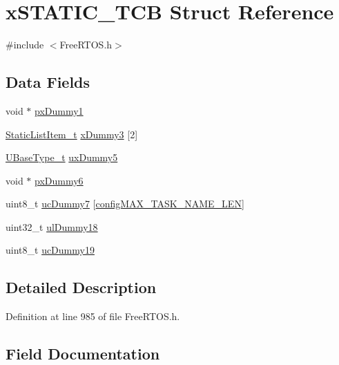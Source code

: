 \hypertarget{structx_s_t_a_t_i_c___t_c_b}{}\section{x\+S\+T\+A\+T\+I\+C\+\_\+\+T\+CB Struct Reference}
\label{structx_s_t_a_t_i_c___t_c_b}


{\ttfamily \#include $<$Free\+R\+T\+O\+S.\+h$>$}

\subsection*{Data Fields}
\begin{DoxyCompactItemize}
\item 
void $\ast$ \hyperlink{structx_s_t_a_t_i_c___t_c_b_a2f66b620fdeb13f8969f27e1bbb4d1d1}{px\+Dummy1}
\item 
\hyperlink{_free_r_t_o_s_8h_a1d31bc0472385a87424518da484d9e09}{Static\+List\+Item\+\_\+t} \hyperlink{structx_s_t_a_t_i_c___t_c_b_a7f182aa8f5003494f63d975dabcb3ec1}{x\+Dummy3} \mbox{[}2\mbox{]}
\item 
\hyperlink{portmacro_8h_a646f89d4298e4f5afd522202b11cb2e6}{U\+Base\+Type\+\_\+t} \hyperlink{structx_s_t_a_t_i_c___t_c_b_ab950bb498901ef7291e49086e5a2efd0}{ux\+Dummy5}
\item 
void $\ast$ \hyperlink{structx_s_t_a_t_i_c___t_c_b_a416495e152e5caef64994f72329c60b0}{px\+Dummy6}
\item 
uint8\+\_\+t \hyperlink{structx_s_t_a_t_i_c___t_c_b_a308771ccd6723cad777695d84a0a2a30}{uc\+Dummy7} \mbox{[}\hyperlink{_free_r_t_o_s_config_8h_ac388dc4041aab6997348828eb27fc1a8}{config\+M\+A\+X\+\_\+\+T\+A\+S\+K\+\_\+\+N\+A\+M\+E\+\_\+\+L\+EN}\mbox{]}
\item 
uint32\+\_\+t \hyperlink{structx_s_t_a_t_i_c___t_c_b_ade6781276f913dcd592ee0f6cce76c7e}{ul\+Dummy18}
\item 
uint8\+\_\+t \hyperlink{structx_s_t_a_t_i_c___t_c_b_aa98151056a161f180013ae36dae0d17b}{uc\+Dummy19}
\end{DoxyCompactItemize}


\subsection{Detailed Description}


Definition at line 985 of file Free\+R\+T\+O\+S.\+h.



\subsection{Field Documentation}
\mbox{\label{structx_s_t_a_t_i_c___t_c_b_a2f66b620fdeb13f8969f27e1bbb4d1d1}} 
